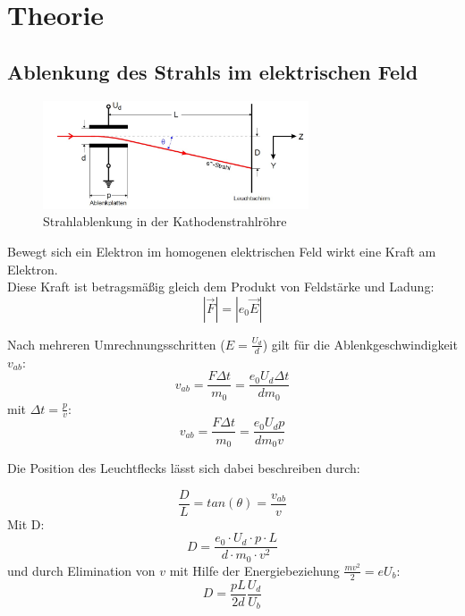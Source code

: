 \section{Theorie}

\subsection{Ablenkung des Strahls im elektrischen Feld}
\begin{figure}[h]
  \centering
  \includegraphics[width=0.7\textwidth]{Grafiken/V501(2)_Abb1.jpg}
  \caption{Strahlablenkung in der Kathodenstrahlröhre}
\end{figure}
Bewegt sich ein Elektron im homogenen elektrischen Feld wirkt eine Kraft am Elektron. \\
Diese Kraft ist betragsmäßig gleich dem Produkt von Feldstärke und
Ladung:
\begin{equation}
  \label{eq:force}
  |\vec{F}| = |e_0\vec{E}|
\end{equation}

Nach mehreren Umrechnungsschritten ($E = \frac{U_d}{d}$) gilt für die Ablenkgeschwindigkeit $v_{ab}$:
\begin{equation}
  v_{ab} = \frac{F\Delta t}{m_0} = \frac{e_0 U_d\Delta t}{d m_0}
\end{equation}
mit $\Delta t =\frac{p}{v}$:
\begin{equation}
	v_{ab} = \frac{F\Delta t}{m_0} = \frac{e_0 U_d p}{d m_0 v}
\end{equation}

Die Position des Leuchtflecks lässt sich dabei beschreiben durch:

\begin{equation}
	\frac{D}{L} = tan(\theta) =  \frac{v_{ab}}{v}
\end{equation}
Mit D:
\begin{equation}
	D = \frac{e_0\cdot U_d\cdot p\cdot L}{d\cdot m_0\cdot v^2}
\end{equation}
und durch Elimination von $v$ mit Hilfe der Energiebeziehung $\frac{m v^2}{2} = eU_{b}$:
\begin{equation}
	\label{eq:Theorie_D}
	D = \frac{p L}{2d}\frac{U_{d}}{U_{b}}
\end{equation}

